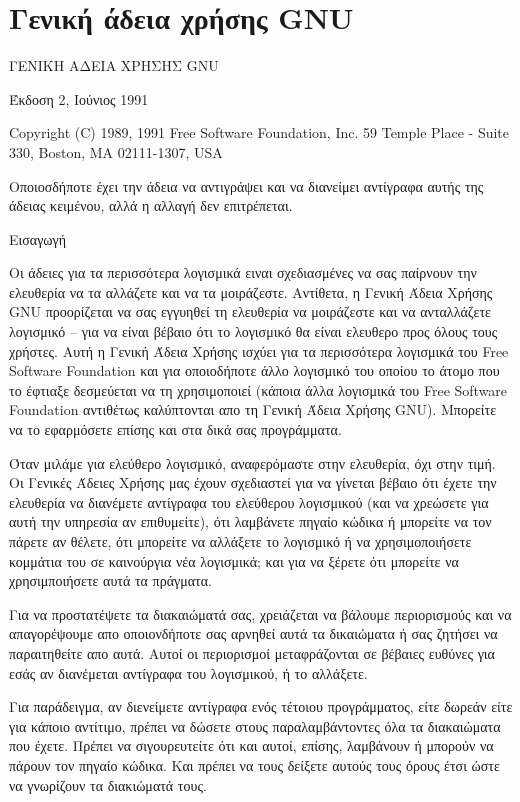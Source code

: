 \section{Γενική άδεια χρήσης GNU}\label{gpl_appendix}

\begin{small}
\begin{center}
ΓΕΝΙΚΗ ΑΔΕΙΑ ΧΡΗΣΗΣ GNU

Έκδοση 2, Ιούνιος 1991


Copyright (C) 1989, 1991 Free Software Foundation, Inc.  
59 Temple Place - Suite 330, Boston, MA  02111-1307, USA


Οποιοσδήποτε έχει την άδεια να αντιγράψει και να διανείμει αντίγραφα αυτής της άδειας κειμένου, αλλά η αλλαγή δεν επιτρέπεται.
\end{center}
Εισαγωγή

Οι άδειες για τα περισσότερα λογισμικά ειναι σχεδιασμένες να σας παίρνουν την ελευθερία να τα αλλάζετε και να τα μοιράζεστε. Αντίθετα, η Γενική Άδεια Χρήσης GNU προορίζεται να σας εγγυηθεί τη ελευθερία να μοιράζεστε και να ανταλλάζετε λογισμικό – για να είναι βέβαιο ότι το λογισμικό θα είναι ελευθερο προς όλους τους χρήστες. Αυτή η Γενική Άδεια Χρήσης ισχύει για τα περισσότερα λογισμικά του Free Software Foundation και για οποιοδήποτε άλλο λογισμικό του οποίου το άτομο που το έφτιαξε δεσμεύεται να τη χρησιμοποιεί (κάποια άλλα λογισμικά του Free Software Foundation αντιθέτως καλύπτονται απο τη Γενική Άδεια Χρήσης GNU). Μπορείτε να το εφαρμόσετε επίσης και στα δικά σας προγράμματα.

Όταν μιλάμε για ελεύθερο λογισμικό, αναφερόμαστε στην ελευθερία, όχι στην τιμή. Οι Γενικές Άδειες Χρήσης μας έχουν σχεδιαστεί για να γίνεται βέβαιο ότι έχετε την ελευθερία να διανέμετε αντίγραφα του ελεύθερου λογισμικού (και να χρεώσετε για αυτή την υπηρεσία αν επιθυμείτε), ότι λαμβάνετε πηγαίο κώδικα ή μπορείτε να τον πάρετε αν θέλετε, ότι μπορείτε να αλλάξετε το λογισμικό ή να χρησιμοποιήσετε κομμάτια του σε καινούργια νέα λογισμικά; και για να ξέρετε ότι μπορείτε να χρησιμποιήσετε αυτά τα πράγματα.

Για να προστατέψετε τα διακαιώματά σας, χρειάζεται να βάλουμε περιορισμούς και να απαγορέψουμε απο οποιονδήποτε σας αρνηθεί αυτά τα δικαιώματα ή σας ζητήσει να παραιτηθείτε απο αυτά. Αυτοί οι περιορισμοί μεταφράζονται σε βέβαιες ευθύνες για εσάς αν διανέμεται αντίγραφα του λογισμικού, ή το αλλάξετε.

Για παράδειγμα, αν διενείμετε αντίγραφα ενός τέτοιου προγράμματος, είτε δωρεάν είτε για κάποιο αντίτιμο, πρέπει να δώσετε στους παραλαμβάντοντες όλα τα διακαιώματα που έχετε. Πρέπει να σιγουρευτείτε ότι και αυτοί, επίσης, λαμβάνουν ή μπορούν να πάρουν τον πηγαίο κώδικα. Και πρέπει να τους δείξετε αυτούς τους όρους έτσι ώστε να γνωρίζουν τα διακιώματά τους.


\end{small}
